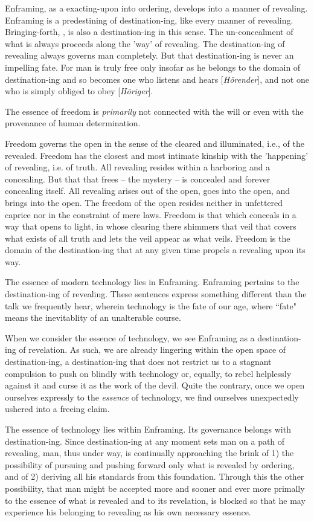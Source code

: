 Enframing, as a exacting-upon into ordering, develops into a manner of revealing. Enframing is a predestining of destination-ing, like every manner of revealing. Bringing-forth, , is also a destination-ing in this sense. The un-concealment of what is always proceeds along the 'way' of revealing. The destination-ing of revealing always governs man completely. But that destination-ing is never an impelling fate. For man is truly free only insofar as he belongs to the domain of destination-ing and so becomes one who listens and hears [\textit{H\"{o}render}], and not one who is simply obliged to obey [\textit{H\"{o}riger}].

The essence of freedom is \textit{primarily} not connected with the will or even with the provenance of human determination.

Freedom governs the open in the sense of the cleared and illuminated, i.e., of the revealed. Freedom has the closest and most intimate kinship with the 'happening' of revealing, i.e. of truth. All revealing resides within a harboring and a concealing. But that that frees -- the mystery -- is concealed and forever concealing itself. All revealing arises out of the open, goes into the open, and brings into the open. The freedom of the open resides neither in unfettered caprice nor in the constraint of mere laws. Freedom is that which conceals in a way that opens to light, in whose clearing there shimmers that veil that covers what exists of all truth and lets the veil appear as what veils. Freedom is the domain of the destination-ing that at any given time propels a revealing upon its way.

The essence of modern technology lies in Enframing. Enframing pertains to the destination-ing of revealing. These sentences express something different than the talk we frequently hear, wherein technology is the fate of our age, where ``fate" means the inevitablity of an unalterable course.

When we consider the essence of technology, we see Enframing as a destination-ing of revelation. As such, we are already lingering within the open space of destination-ing, a destination-ing that does not restrict us to a stagnant compulsion to push on blindly with technology or, equally, to rebel helplessly against it and curse it as the work of the devil. Quite the contrary, once we open ourselves expressly to the \textit{essence} of technology, we find ourselves unexpectedly ushered into a freeing claim.

The essence of technology lies within Enframing. Its governance belongs with destination-ing. Since destination-ing at any moment sets man on a path of revealing, man, thus under way, is continually approaching the brink of 1) the possibility of pursuing and pushing forward only what is revealed by ordering, and of 2) deriving all his standards from this foundation. Through this the other possibility, that man might be accepted more and sooner and ever more primally to the essence of what is revealed and to its revelation, is blocked so that he may experience his belonging to revealing as his own necessary essence.

